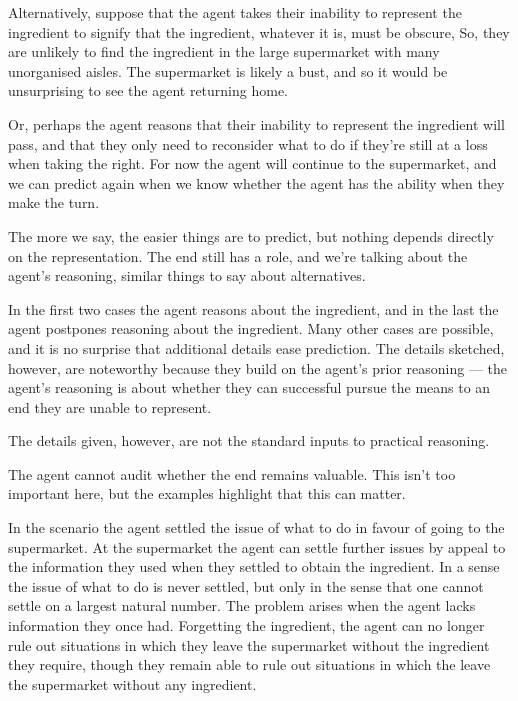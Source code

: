 \documentclass[10pt]{article}
\begin{document}
{  Alternatively, suppose that the agent takes their inability to represent the ingredient to signify that the ingredient, whatever it is, must be obscure,
  So, they are unlikely to find the ingredient in the large supermarket with many unorganised aisles.
  The supermarket is likely a bust, and so it would be unsurprising to see the agent returning home.

  Or, perhaps the agent reasons that their inability to represent the ingredient will pass, and that they only need to reconsider what to do if they're still at a loss when taking the right.
  For now the agent will continue to the supermarket, and we can predict again when we know whether the agent has the ability when they make the turn.

  {\color{green} The more we say, the easier things are to predict, but nothing depends directly on the representation.
    The end still has a role, and we're talking about the agent's reasoning, similar things to say about alternatives.}

  In the first two cases the agent reasons about the ingredient, and in the last the agent postpones reasoning about the ingredient.
  Many other cases are possible, and it is no surprise that additional details ease prediction.
  The details sketched, however, are noteworthy because they build on the agent's prior reasoning --- the agent's reasoning is about whether they can successful pursue the means to an end they are unable to represent.
  
  

  The details given, however, are not the standard inputs to practical reasoning.

  The agent cannot audit whether the end remains valuable.
  This isn't too important here, but the examples highlight that this can matter.

}



In the scenario the agent settled the issue of what to do in favour of going to the supermarket.
At the supermarket the agent can settle further issues by appeal to the information they used when they settled to obtain the ingredient.
In a sense the issue of what to do is never settled, but only in the sense that one cannot settle on a largest natural number.
The problem arises when the agent lacks information they once had.
Forgetting the ingredient, the agent can no longer rule out situations in which they leave the supermarket without the ingredient they require, though they remain able to rule out situations in which the leave the supermarket without any ingredient.
\end{document}
